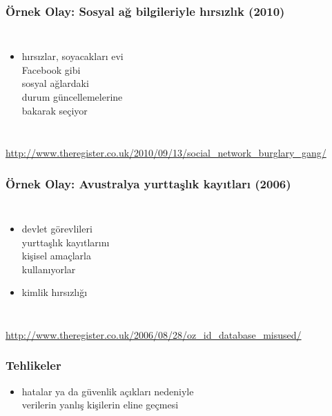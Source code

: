 \documentclass[dvipsnames]{beamer}
\theoremstyle{definition}
\theoremstyle{example}
\theoremstyle{plain}
\begin{document}
\begin{frame}
  \frametitle{Örnek Olay: Sosyal ağ bilgileriyle hırsızlık (2010)}

  \begin{columns}

    \begin{itemize}
      \item hırsızlar, soyacakları evi\\
        Facebook gibi\\
        sosyal ağlardaki\\
        durum güncellemelerine\\
        bakarak seçiyor
    \end{itemize}
  \end{columns}

  \medskip
  \tiny{\url{http://www.theregister.co.uk/2010/09/13/social_network_burglary_gang/}}
\end{frame}

\begin{frame}
  \frametitle{Örnek Olay: Avustralya yurttaşlık kayıtları (2006)}

  \begin{columns}

    \begin{itemize}
      \item devlet görevlileri\\
        yurttaşlık kayıtlarını\\
        kişisel amaçlarla\\
        kullanıyorlar
      \item kimlik hırsızlığı
    \end{itemize}
  \end{columns}

  \medskip
  \tiny{\url{http://www.theregister.co.uk/2006/08/28/oz_id_database_misused/}}
\end{frame}

\begin{frame}
  \frametitle{Tehlikeler}

  \begin{itemize}
    \item hatalar ya da güvenlik açıkları nedeniyle\\
      verilerin yanlış kişilerin eline geçmesi
  \end{itemize}
\end{frame}
\end{document}
